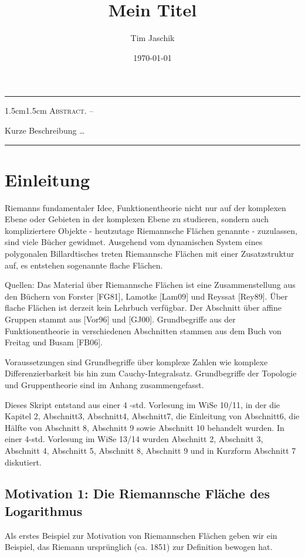 \documentclass[10pt, letterpaper]{article}
\title{Mein Titel}
\author{Tim Jaschik}
\date{\today}
\renewenvironment{abstract}
  {
    \begin{adjustwidth}{1.5cm}{1.5cm}
    \small
    \textsc{Abstract. –}%
  }
  {
    \end{adjustwidth}
  }
\begin{document}
\maketitle
\rule{\textwidth}{0.5pt}
\begin{abstract}
Kurze Beschreibung …
\end{abstract}
\rule{\textwidth}{0.5pt}
\vspace{0.5cm}

\tableofcontents

\pagebreak


\section {Einleitung}
Riemanns fundamentaler Idee, Funktionentheorie nicht nur auf der komplexen Ebene oder Gebieten in der komplexen Ebene zu studieren, sondern auch kompliziertere Objekte - heutzutage Riemannsche Flächen genannte - zuzulassen, sind viele Bücher gewidmet. Ausgehend vom dynamischen System eines polygonalen Billardtisches treten Riemannsche Flächen mit einer Zusatzstruktur auf, es entstehen sogenannte flache Flächen.

Quellen: Das Material über Riemannsche Flächen ist eine Zusammenstellung aus den Büchern von Forster [FG81], Lamotke [Lam09] und Reyssat [Rey89]. Über flache Flächen ist derzeit kein Lehrbuch verfügbar. Der Abschnitt über affine Gruppen stammt aus [Vor96] und [GJ00]. Grundbegriffe aus der Funktionentheorie in verschiedenen Abschnitten stammen aus dem Buch von Freitag und Busam [FB06].

Voraussetzungen sind Grundbegriffe über komplexe Zahlen wie komplexe Differenzierbarkeit bis hin zum Cauchy-Integralsatz. Grundbegriffe der Topologie und Gruppentheorie sind im Anhang zusammengefasst.

Dieses Skript entstand aus einer 4 -std. Vorlesung im WiSe 10/11, in der die Kapitel 2, Abschnitt3, Abschnitt4, Abschnitt7, die Einleitung von Abschnitt6, die Hälfte von Abschnitt 8, Abschnitt 9 sowie Abschnitt 10 behandelt wurden. In einer 4-std. Vorlesung im WiSe 13/14 wurden Abschnitt 2, Abschnitt 3, Abschnitt 4, Abschnitt 5, Abschnitt 8, Abschnitt 9 und in Kurzform Abschnitt 7 diskutiert.

\subsection {Motivation 1: Die Riemannsche Fläche des Logarithmus}
Als erstes Beispiel zur Motivation von Riemannschen Flächen geben wir ein Beispiel, das Riemann ursprünglich (ca. 1851) zur Definition bewogen hat.
\end{document}
